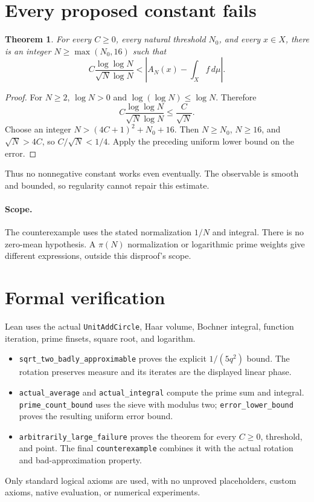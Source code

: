 \documentclass[11pt]{article}
\newtheorem{theorem}{Theorem}
\begin{document}
\newpage
\section{Every proposed constant fails}
\begin{theorem}
For every $C\geq0$, every natural threshold $N_0$, and every $x\in X$,
there is an integer $N\geq\max(N_0,16)$ such that
\[
 C\frac{\log\log N}{\sqrt N\log N}
 <\left|A_N(x)-\int_X f\,d\mu\right|.
\]
\end{theorem}
\begin{proof}
For $N\geq2$, $\log N>0$ and $\log(\log N)\leq\log N$. Therefore
\[
 C\frac{\log\log N}{\sqrt N\log N}\leq\frac C{\sqrt N}.
\]
Choose an integer $N>(4C+1)^2+N_0+16$. Then $N\geq N_0$, $N\geq16$,
and $\sqrt N>4C$, so $C/\sqrt N<1/4$. Apply the preceding uniform
lower bound on the error.
\end{proof}
Thus no nonnegative constant works even eventually. The observable is
smooth and bounded, so regularity cannot repair this estimate.

\paragraph{Scope.}
The counterexample uses the stated normalization $1/N$ and integral.
There is no zero-mean hypothesis. A $\pi(N)$ normalization or logarithmic
prime weights give different expressions, outside this disproof's scope.

\section{Formal verification}
Lean uses the actual \texttt{UnitAddCircle}, Haar volume, Bochner integral,
function iteration, prime finsets, square root, and logarithm.
\begingroup\raggedright
\begin{itemize}
\setlength{\itemsep}{3pt}
\item \texttt{sqrt\_\allowbreak two\_\allowbreak badly\_\allowbreak approximable}
proves the explicit $1/(5q^2)$ bound. The rotation preserves measure and its
iterates are the displayed linear phase.
\item \texttt{actual\_\allowbreak average} and \texttt{actual\_\allowbreak integral}
compute the prime sum and integral. \texttt{prime\_\allowbreak count\_\allowbreak bound}
uses the sieve with modulus two; \texttt{error\_\allowbreak lower\_\allowbreak bound}
proves the resulting uniform error bound.
\item \texttt{arbitrarily\_\allowbreak large\_\allowbreak failure} proves the theorem for
every $C\geq0$, threshold, and point. The final \texttt{counterexample}
combines it with the actual rotation and bad-approximation property.
\end{itemize}
\endgroup
Only standard logical axioms are used, with no unproved placeholders,
custom axioms, native evaluation, or numerical experiments.
\end{document}
